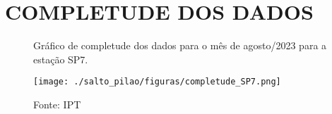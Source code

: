 \section{COMPLETUDE DOS DADOS}

\begin{figure}[htb!]
    \centering
	\captionsetup{justification=raggedright, singlelinecheck=false, width=1\textwidth}
    \caption{Gráfico de completude dos dados para o mês de agosto/2023 para a estação SP7.}
    \begin{mdframed}[
        linecolor=black,
        linewidth=1pt,
        roundcorner=10pt,
    ]
    \texttt{[image: ./salto\_pilao/figuras/completude\_SP7.png]} %
    \end{mdframed}
    \caption*{Fonte: IPT}
    \label{fig:completude}
\end{figure}

